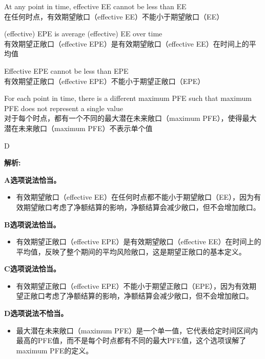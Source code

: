 \documentclass{article}
\newenvironment{explanation}
{\textbf{解析:}\par}
{\par}
\begin{document}
\begin{choices}
    \item At any point in time, effective EE cannot be less than EE\\
    在任何时点，有效期望敞口（effective EE）不能小于期望敞口（EE）
    \item (effective) EPE is average (effective) EE over time\\
    有效期望正敞口（effective EPE）是有效期望敞口（effective EE）在时间上的平均值
    \item Effective EPE cannot be less than EPE\\
    有效期望正敞口（effective EPE）不能小于期望正敞口（EPE）
    \item For each point in time, there is a different maximum PFE such that maximum PFE does not represent a single value\\
    对于每个时点，都有一个不同的最大潜在未来敞口（maximum PFE），使得最大潜在未来敞口（maximum PFE）不表示单个值
\end{choices}

\begin{correctanswer}
    D
\end{correctanswer}

\begin{explanation}
    \textbf{A选项说法恰当。}
    \begin{itemize}
        \item 有效期望敞口（effective EE）在任何时点都不能小于期望敞口（EE），因为有效期望敞口考虑了净额结算的影响，净额结算会减少敞口，但不会增加敞口。
    \end{itemize}

    \textbf{B选项说法恰当。}
    \begin{itemize}
        \item 有效期望正敞口（effective EPE）是有效期望敞口（effective EE）在时间上的平均值，反映了整个期间的平均风险敞口，这是期望正敞口的基本定义。
    \end{itemize}

    \textbf{C选项说法恰当。}
    \begin{itemize}
        \item 有效期望正敞口（effective EPE）不能小于期望正敞口（EPE），因为有效期望正敞口考虑了净额结算的影响，净额结算会减少敞口，但不会增加敞口。
    \end{itemize}

    \textbf{D选项说法不恰当。}
    \begin{itemize}
        \item 最大潜在未来敞口（maximum PFE）是一个单一值，它代表给定时间区间内最高的PFE值，而不是每个时点都有不同的最大PFE值，这个选项误解了maximum PFE的定义。
    \end{itemize}
\end{explanation}
\end{document}
